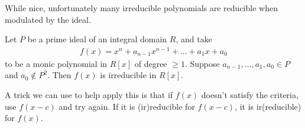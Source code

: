 \documentclass{memoir}
\begin{document}
While nice, unfortunately many irreducible polynomials are reducible when modulated by the ideal.

\begin{thm}
	Let \(P\) be a prime ideal of an integral domain \(R\), and take
	\begin{align*}
		f(x) = x^{n}+ a_{n-1}x^{n-1}+ \ldots + a_1x + a_0
	\end{align*}
	to be a monic polynomial in \(R[x]\) of degree \(\geq 1\). Suppose \(a_{n-1},\ldots,a_1,a_0 \in P\) and \(a_0 \not\in P^2\). Then \(f(x) \) is irreducible in \(R[x]\).
\end{thm}
A trick we can use to help apply this is that if \(f(x)\) doesn't satisfy the criteria, use \(f(x-c)\) and try again. If it is (ir)reducible for \(f(x-c)\), it is ir(reducible) for \(f(x)\).
\end{document}
